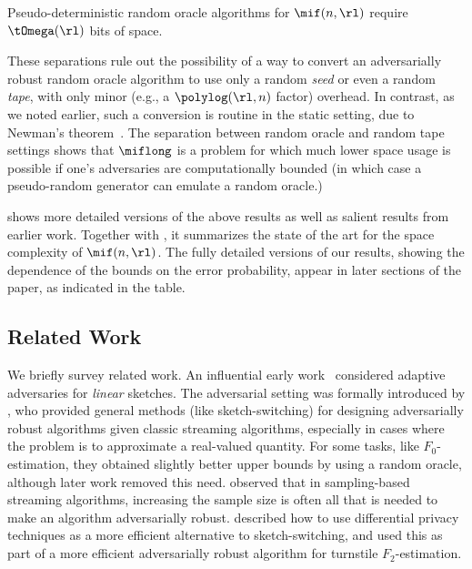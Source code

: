 \begin{itemize}
\begin{itemize}
\begin{result} \label{res:pd-lb}
  Pseudo-deterministic random oracle algorithms for $\mif(n,\rl)$ require
  $\tOmega(\rl)$ bits of space.
\end{result}

These separations rule out the possibility of a way to convert an
adversarially robust random oracle algorithm to use only a random {\em seed}
or even a random {\em tape}, with only minor (e.g., a $\polylog(\rl,n)$
factor) overhead. In contrast, as we noted earlier, such a conversion is
routine in the static setting, due to Newman's theorem~\cite{Newman91}.
%
The separation between random oracle and random tape settings shows that
$\miflong$ is a problem for which much lower space usage is possible if one's
adversaries are computationally bounded (in which case a pseudo-random
generator can emulate a random oracle.)


 shows more detailed versions of the above results
as well as salient results from earlier work. Together with
, it summarizes the state of the art for the space
complexity of $\mif(n, \rl)$.  The fully detailed versions of our results,
showing the dependence of the bounds on the error probability, appear in later
sections of the paper, as indicated in the table.

\subsection{Related Work}

We briefly survey related work. An influential early work~\cite{HardtW13}
considered adaptive adversaries for {\em linear} sketches.  The adversarial
setting was formally introduced by \cite{BenEliezerJWY20}, who provided
general methods (like sketch-switching) for designing adversarially robust
algorithms given classic streaming algorithms, especially in cases where the
problem is to approximate a real-valued quantity. For some tasks, like
$F_0$-estimation, they obtained slightly better upper bounds by using a random
oracle, although later work \cite{WoodruffZ22} removed this need.
\cite{BenEliezerY20} observed that in sampling-based streaming algorithms,
increasing the sample size is often all that is needed to make an algorithm
adversarially robust. \cite{HassidimKMMS20} described how to use differential
privacy techniques as a more efficient alternative to sketch-switching, and
\cite{BenEliezerEO22} used this as part of a more efficient adversarially
robust algorithm for turnstile $F_2$-estimation.


\end{itemize}
\end{itemize}
